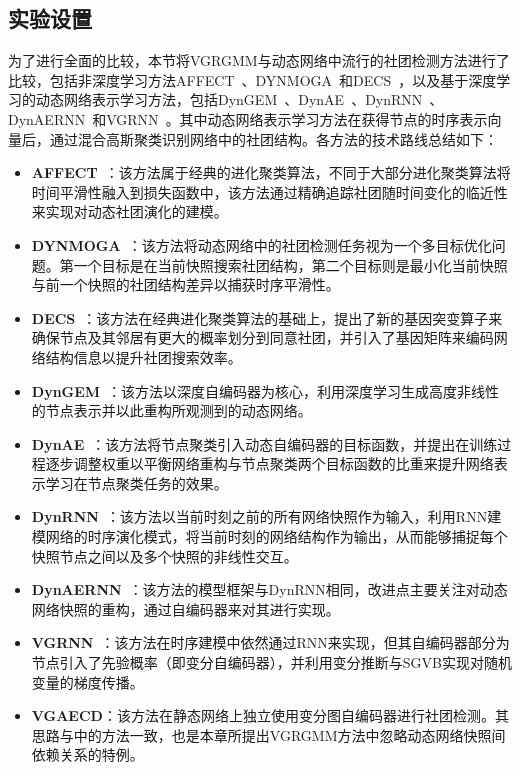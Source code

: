 \subsection{实验设置}

为了进行全面的比较，本节将VGRGMM与动态网络中流行的社团检测方法进行了比较，包括非深度学习方法AFFECT~\cite{xu2014adaptive}、DYNMOGA~\cite{folino2013evolutionary}和DECS~\cite{liu2020detecting}，以及基于深度学习的动态网络表示学习方法，包括DynGEM~\cite{goyal2018dyngem}、DynAE~\cite{mrabah2019deep}、DynRNN~\cite{goyal2020dyngraph2vec}、DynAERNN~\cite{goyal2020dyngraph2vec}和VGRNN~\cite{hajiramezanali2019variational}。其中动态网络表示学习方法在获得节点的时序表示向量后，通过混合高斯聚类识别网络中的社团结构。各方法的技术路线总结如下：
\begin{itemize}
    \item \textbf{AFFECT}~\cite{xu2014adaptive}：该方法属于经典的进化聚类算法，不同于大部分进化聚类算法将时间平滑性融入到损失函数中，该方法通过精确追踪社团随时间变化的临近性来实现对动态社团演化的建模。
    \item \textbf{DYNMOGA}~\cite{folino2013evolutionary}：该方法将动态网络中的社团检测任务视为一个多目标优化问题。第一个目标是在当前快照搜索社团结构，第二个目标则是最小化当前快照与前一个快照的社团结构差异以捕获时序平滑性。
    \item \textbf{DECS}~\cite{liu2020detecting}：该方法在经典进化聚类算法的基础上，提出了新的基因突变算子来确保节点及其邻居有更大的概率划分到同意社团，并引入了基因矩阵来编码网络结构信息以提升社团搜索效率。
    \item \textbf{DynGEM}~\cite{goyal2018dyngem}：该方法以深度自编码器为核心，利用深度学习生成高度非线性的节点表示并以此重构所观测到的动态网络。
    \item \textbf{DynAE}~\cite{mrabah2019deep}：该方法将节点聚类引入动态自编码器的目标函数，并提出在训练过程逐步调整权重以平衡网络重构与节点聚类两个目标函数的比重来提升网络表示学习在节点聚类任务的效果。
    \item \textbf{DynRNN}~\cite{goyal2020dyngraph2vec}：该方法以当前时刻之前的所有网络快照作为输入，利用RNN建模网络的时序演化模式，将当前时刻的网络结构作为输出，从而能够捕捉每个快照节点之间以及多个快照的非线性交互。
    \item \textbf{DynAERNN}~\cite{goyal2020dyngraph2vec}：该方法的模型框架与DynRNN相同，改进点主要关注对动态网络快照的重构，通过自编码器来对其进行实现。
    \item \textbf{VGRNN}~\cite{hajiramezanali2019variational}：该方法在时序建模中依然通过RNN来实现，但其自编码器部分为节点引入了先验概率（即变分自编码器），并利用变分推断与SGVB实现对随机变量的梯度传播。
    \item \textbf{VGAECD}：该方法在静态网络上独立使用变分图自编码器进行社团检测。其思路与\cite{choong2018learning}中的方法一致，也是本章所提出VGRGMM方法中忽略动态网络快照间依赖关系的特例。
\end{itemize}


